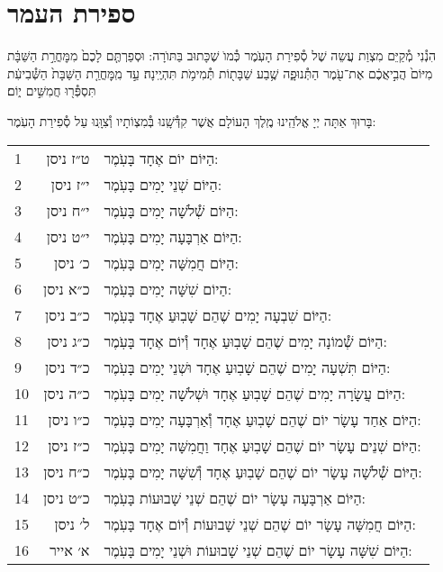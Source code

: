 \documentclass[twoside, openany, parskip=half, 11pt]{book}
\begin{document}
\section{ספירת העמר}
\label{sefiras haomer}

הִנְ֯נִי מְ֯קַיֵּם מִצְוַת עֲשֵה שֶׁל סְ֯פִירַת הָעֽׂמֶר כְּ֯מוׂ שֶׁכָּתוּב בַּתּוׂרָה: וּסְפַרְתֶּ֤ם לָכֶם֙ מִמׇּחֳרַ֣ת הַשַּׁבָּ֔ת מִיּוֹם֙ הֲבִ֣יאֲכֶ֔ם אֶת־עֹ֖מֶר הַתְּ֯נוּפָ֑ה שֶׁ֥בַע שַׁבָּת֖וֹת תְּ֯מִימֹ֥ת תִּהְיֶֽינָה׃ עַ֣ד מִֽמׇּחֳרַ֤ת הַשַּׁבָּת֙ הַשְּׁ֯בִיעִ֔ת תִּסְפְּ֯ר֖וּ חֲמִשִּׁ֣ים י֑וֹם׃

בָּרוּךְ אַתָּה יְיָ אֱלֹהֵֽינוּ מֶֽלֶךְ הָעוֹלָם אֲשֶׁר קִדְּ֯שָֽׁנוּ בְּ֯מִצְוֹתָיו וְ֯צִוָּֽנוּ עַל סְ֯פִירַת הָעֹֽמֶר:\\

\begin{scriptsize}
\begin{longtable}{ l | r | p{} }
1 & ט״ז ניסן & הַיּוֹם יוֹם אֶחָד בָּעֹֽמֶר: \\
2 & י״ז ניסן & הַיּוֹם שְׁנֵי יָמִים בָּעֹֽמֶר: \\
3 & י״ח ניסן & הַיּוֹם שְׁ֯לֹשָׁה יָמִים בָּעֹֽמֶר: \\
4 & י״ט ניסן & הַיּוֹם אַרְבָּעָה יָמִים בָּעֹֽמֶר: \\
5 & כ׳ ניסן & הַיּוֹם חֲמִשָּׁה יָמִים בָּעֹֽמֶר: \\
6 & כ״א ניסן & הַיוֹם שִׁשָּׁה יָמִים בָּעֹֽמֶר: \\
7 & כ״ב ניסן & הַיּוֹם שִׁבְעָה יָמִים שֶׁהֵם שָׁבֽוּעַ אֶחָד בָּעֹֽמֶר: \\
8 & כ״ג ניסן & הַיּוֹם שְׁ֯מוֹנָה יָמִים שֶׁהֵם שָׁבֽוּעַ אֶחָד וְ֯יוֹם אֶחָד בָּעֹֽמֶר: \\
9 & כ״ד ניסן & הַיּוֹם תִּשְׁעָה יָמִים שֶׁהֵם שָׁבֽוּעַ אֶחָד וּשְׁנֵי יָמִים בָּעֹֽמֶר: \\
10 & כ״ה ניסן & הַיּוֹם עֲשָׂרָה יָמִים שֶׁהֵם שָׁבֽוּעַ אֶחָד וּשְׁלֹשָׁה יָמִים בָּעֹֽמֶר: \\
11 & כ״ו ניסן & הַיּוֹם אַחַד עָשָׂר יוֹם שֶׁהֵם שָׁבֽוּעַ אֶחָד וְ֯אַרְבָּעָה יָמִים בָּעֹֽמֶר: \\
12 & כ״ז ניסן & הַיּוֹם שְׁנֵים עָשָׂר יוֹם שֶׁהֵם שָׁבֽוּעַ אֶחָד וַחֲמִשָּׁה יָמִים בָּעֹֽמֶר: \\
13 & כ״ח ניסן & הַיּוֹם שְׁ֯לֹשָׁה עָשָׂר יוֹם שֶׁהֵם שָׁבֽוּעַ אֶחָד וְ֯שִׁשָּׁה יָמִים בָּעֹֽמֶר: \\
14 & כ״ט ניסן & הַיּוֹם אַרְבָּעָה עָשָׂר יוֹם שֶׁהֵם שְׁנֵי שָׁבוּעוֹת בָּעֹֽמֶר: \\
15 & ל׳ ניסן & הַיּוֹם חֲמִשָּׁה עָשָׂר יוֹם שֶׁהֵם שְׁנֵי שָׁבוּעוֹת וְ֯יוֹם אֶחָד בָּעֹֽמֶר: \\
16 & א׳ אייר & הַיּוֹם שִׁשָּׁה עָשָׂר יוֹם שֶׁהֵם שְׁנֵי שָׁבוּעוֹת וּשְׁנֵי יָמִים בָּעֹֽמֶר: \\

\end{longtable}
\end{scriptsize}
\end{document}
